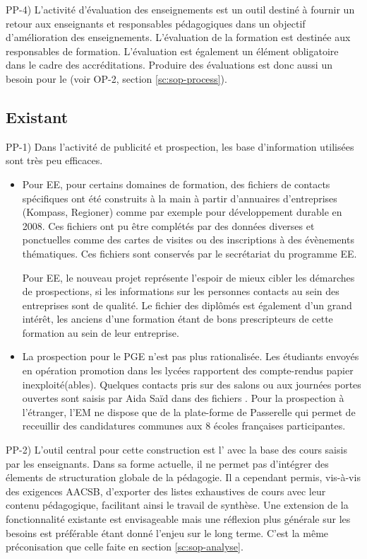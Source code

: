 \documentclass{book}
\begin{document}
PP-4) L'activité d'évaluation des enseignements est un outil destiné à fournir un 
retour aux enseignants et responsables pédagogiques dans un objectif d'amélioration
des enseignements. L'évaluation de la formation est destinée aux responsables de
formation.
L'évaluation est également  un élément obligatoire dans le cadre des accréditations. 
Produire des évaluations est donc aussi un besoin pour le \sop (voir OP-2, 
section \ref{sc:sop-process}). 


\subsection{Existant}

PP-1) Dans l'activité de publicité et prospection, les base d'information 
utilisées sont très peu efficaces. 
\begin{itemize}
\item Pour EE, pour certains domaines de formation, des fichiers de contacts 
spécifiques ont été construits à la main à partir d'annuaires d'entreprises 
(Kompass,  Regioner) comme par exemple pour développement durable en
2008. Ces fichiers ont pu être complétés par des données diverses et ponctuelles
comme des cartes de visites ou des inscriptions à des évènements thématiques.
Ces fichiers sont conservés par le secrétariat du programme EE.

Pour EE, le nouveau projet  représente l'espoir de mieux cibler les
démarches de prospections, si les informations sur les personnes contacts au sein 
des entreprises sont de qualité. Le fichier des diplômés est également d'un 
grand intérêt, les anciens d'une formation étant de bons prescripteurs de cette 
formation au sein de leur entreprise.

\item
La prospection pour le PGE n'est pas plus rationalisée. Les étudiants envoyés
en opération promotion dans les lycées rapportent des compte-rendus papier
inexploité(ables). Quelques contacts pris sur des salons ou aux journées portes
ouvertes sont saisis par Aida Saïd dans des fichiers . Pour la prospection
à l'étranger, l'EM ne dispose que de la plate-forme  de Passerelle
qui permet de receuillir des candidatures communes aux 8 écoles françaises 
participantes. \\
\end{itemize}


PP-2) L'outil central pour cette construction est l' avec 
la base des cours saisis par les enseignants. Dans sa forme actuelle, il 
ne permet pas d'intégrer des élements de structuration globale de la pédagogie. 
Il a cependant permis, vis-à-vis des exigences AACSB, d'exporter des listes 
exhaustives de cours avec leur contenu pédagogique, facilitant ainsi le
travail de synthèse. Une extension de la fonctionnalité existante est 
envisageable mais une réflexion plus générale sur les besoins est préférable 
étant donné l'enjeu sur le long terme. C'est la même préconisation que celle 
faite en section \ref{sc:sop-analyse}.
\end{document}
